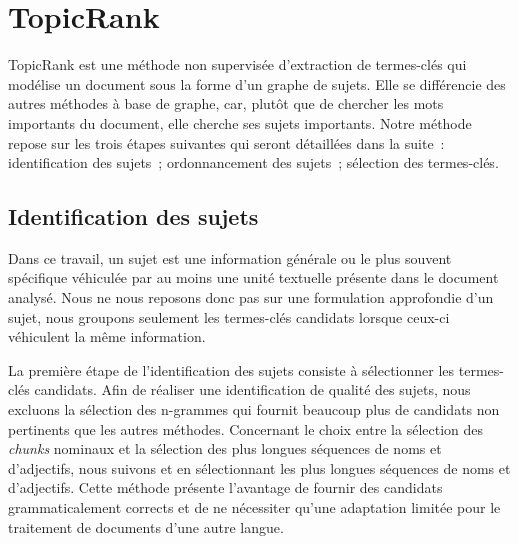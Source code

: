     \section{TopicRank}
    \label{sec:main-automatic_keyphrase_annotation-unsupervised_automatic_keyphrase_extraction-topicrank}
      TopicRank est une méthode non supervisée d'extraction de termes-clés qui
      modélise un document sous la forme d'un graphe de sujets.
      Elle se différencie des autres méthodes à base de graphe, car, plutôt que
      de chercher les mots importants du document, elle cherche ses sujets
      importants.
      Notre méthode repose sur les trois étapes suivantes qui seront détaillées
      dans la suite~: identification des sujets~; ordonnancement des sujets~;
      sélection des termes-clés.

      \subsection{Identification des sujets}
      \label{sec:main-automatic_keyphrase_annotation-unsupervised_automatic_keyphrase_extraction-topicrank-topic_identification}
        Dans ce travail, un sujet est une information générale ou le plus
        souvent spécifique véhiculée par au moins une unité textuelle présente
        dans le document analysé. Nous ne nous reposons donc pas sur une
        formulation approfondie d'un sujet, nous groupons seulement les
        termes-clés candidats lorsque ceux-ci véhiculent la même information.

        La première étape de l'identification des sujets consiste à sélectionner
        les termes-clés candidats.
        Afin de réaliser une identification de qualité des sujets, nous excluons
        la sélection des n-grammes qui fournit beaucoup plus de candidats non
        pertinents que les autres méthodes. Concernant le choix entre la
        sélection des \textit{chunks} nominaux et la sélection des plus longues
        séquences de noms et d'adjectifs, nous suivons
         et  en
        sélectionnant les plus longues séquences de noms et d'adjectifs. Cette
        méthode présente l'avantage de fournir des candidats grammaticalement
        corrects et de ne nécessiter qu'une adaptation limitée pour le
        traitement de documents d'une autre langue.

